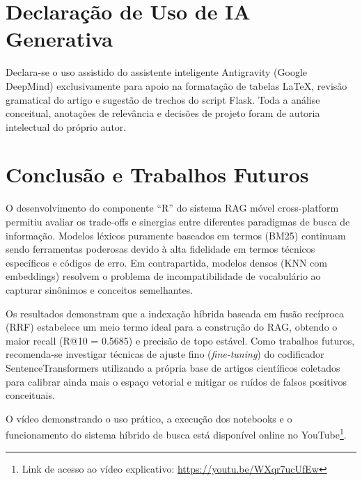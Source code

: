 \documentclass[12pt]{article}
\begin{document}
\section{Declaração de Uso de IA Generativa}

Declara-se o uso assistido do assistente inteligente Antigravity (Google DeepMind) exclusivamente para apoio na formatação de tabelas LaTeX, revisão gramatical do artigo e sugestão de trechos do script Flask. Toda a análise conceitual, anotações de relevância e decisões de projeto foram de autoria intelectual do próprio autor.

\section{Conclusão e Trabalhos Futuros}

O desenvolvimento do componente ``R'' do sistema RAG móvel cross-platform permitiu avaliar os trade-offs e sinergias entre diferentes paradigmas de busca de informação. Modelos léxicos puramente baseados em termos (BM25) continuam sendo ferramentas poderosas devido à alta fidelidade em termos técnicos específicos e códigos de erro. Em contrapartida, modelos densos (KNN com embeddings) resolvem o problema de incompatibilidade de vocabulário ao capturar sinônimos e conceitos semelhantes.

Os resultados demonstram que a indexação híbrida baseada em fusão recíproca (RRF) estabelece um meio termo ideal para a construção do RAG, obtendo o maior recall (R@10 = 0.5685) e precisão de topo estável. Como trabalhos futuros, recomenda-se investigar técnicas de ajuste fino (\textit{fine-tuning}) do codificador SentenceTransformers utilizando a própria base de artigos científicos coletados para calibrar ainda mais o espaço vetorial e mitigar os ruídos de falsos positivos conceituais.

O vídeo demonstrando o uso prático, a execução dos notebooks e o funcionamento do sistema híbrido de busca está disponível online no YouTube\footnote{Link de acesso ao vídeo explicativo: \url{https://youtu.be/WXqr7ucUfEw}}.
\end{document}
